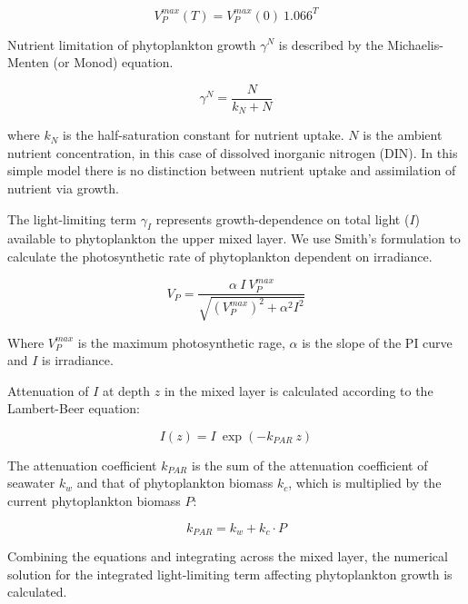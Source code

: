 \documentclass[journal abbreviation, manuscript]{copernicus}
\begin{document}
\begin{equation}
    V_P^{max}(T) = V_P^{max}(0) \ 1.066^T
\end{equation}

Nutrient limitation of phytoplankton growth $\gamma^N$ is described by the Michaelis-Menten (or Monod) equation.

\begin{equation}
    \gamma^N = \frac{N}{k_N + N}
\end{equation}

where $k_N$ is the half-saturation constant for nutrient uptake. $N$ is the ambient nutrient concentration, in this case of dissolved inorganic nitrogen (DIN). In this simple model there is no distinction between nutrient uptake and assimilation of nutrient via growth.

The light-limiting term $\gamma_{I}$ represents growth-dependence on total light ($I$) available to phytoplankton the upper mixed layer. We use Smith's formulation to calculate the photosynthetic rate of phytoplankton dependent on irradiance.

\begin{equation}
    V_P = \frac{\alpha ~ I ~ V_P^{max}}{\sqrt{(V_P^{max})^2 + \alpha^2 I^2}}
\end{equation}

Where $V_P^{max}$ is the maximum photosynthetic rage, $\alpha$ is the slope of the PI curve and $I$ is irradiance.

Attenuation of $I$ at depth $z$ in the mixed layer is calculated according to the Lambert-Beer equation:

\begin{equation}
    I(z) = I \ \exp{(-k_{PAR} \ z)}
\end{equation}

The attenuation coefficient $k_{PAR}$ is the sum of the attenuation coefficient of seawater $k_w$ and that of phytoplankton biomass $k_c$, which is multiplied by the current phytoplankton biomass $P$:

\begin{equation}
    k_{PAR} = k_w + k_c \cdot P
\end{equation}

Combining the equations and integrating across the mixed layer, the numerical solution for the integrated light-limiting term affecting phytoplankton growth is calculated.
\end{document}
